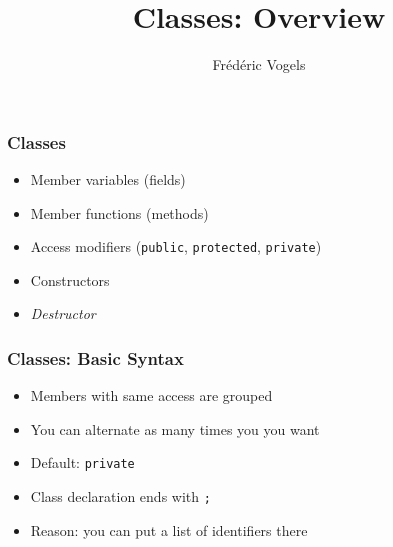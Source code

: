 \usepackage{../pvm}
\usetikzlibrary{shadows,shapes.multipart}

\title{Classes: Overview}
\author{Fr\'ed\'eric Vogels}

\newcommand{\highlightbox}[2][]{
  \draw[opacity=.75,ultra thick,red,#1] ($ (#2.south west) + (-.1,-.1) $) rectangle ($ (#2.north east) + (.1,.1) $)
}




\begin{frame}
  \titlepage
\end{frame}

\begin{frame}
  \frametitle{Classes}
  \begin{itemize}
    \item Member variables (fields)
    \item Member functions (methods)
    \item Access modifiers ({\tt public}, {\tt protected}, {\tt private})
    \item Constructors
    \item \emph{Destructor}
  \end{itemize}
\end{frame}

\begin{frame}
  \frametitle{Classes: Basic Syntax}
  \begin{overprint}
    \begin{itemize}
      \item Members with same access are grouped
      \item You can alternate as many times you you want
      \item Default: {\tt private}
    \end{itemize}
    \begin{itemize}
      \item Class declaration ends with {\tt ;}
      \item Reason: you can put a list of identifiers there
    \end{itemize}
  \end{overprint}
\end{frame}

